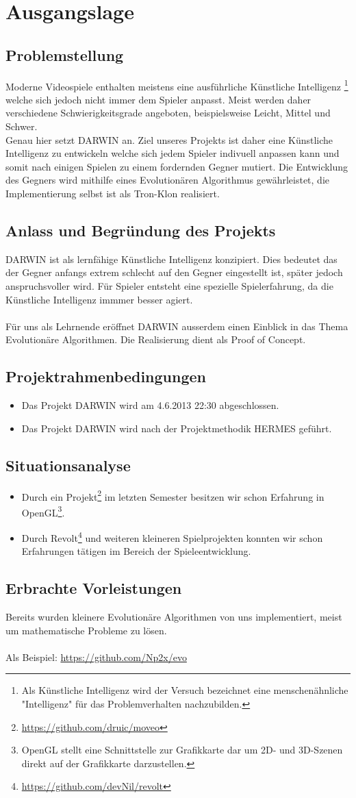 \section{Ausgangslage}
\subsection{Problemstellung}
Moderne Videospiele enthalten meistens eine ausführliche Künstliche Intelligenz
\footnote{Als Künstliche Intelligenz wird der Versuch bezeichnet eine menschenähnliche "Intelligenz" für das Problemverhalten nachzubilden.} welche sich jedoch nicht immer dem Spieler anpasst. Meist werden daher verschiedene Schwierigkeitsgrade angeboten, beispielsweise Leicht, Mittel und Schwer.\\
Genau hier setzt DARWIN an. Ziel unseres Projekts ist daher eine Künstliche Intelligenz zu entwickeln welche sich jedem Spieler indivuell anpassen kann und somit nach einigen Spielen zu einem fordernden Gegner mutiert. Die Entwicklung des Gegners wird mithilfe eines Evolutionären Algorithmus gewährleistet, die Implementierung selbst ist als Tron-Klon realisiert.
\subsection{Anlass und Begründung des Projekts}
DARWIN ist als lernfähige Künstliche Intelligenz konzipiert. Dies bedeutet das der Gegner anfangs extrem schlecht auf den Gegner eingestellt ist, später jedoch anspruchsvoller wird. Für Spieler entsteht eine spezielle Spielerfahrung, da die Künstliche Intelligenz immmer besser agiert. \\\\Für uns als Lehrnende eröffnet DARWIN ausserdem einen Einblick in das Thema Evolutionäre Algorithmen. Die Realisierung dient als Proof of Concept.
\subsection{Projektrahmenbedingungen}
\begin{itemize}
	\item Das Projekt DARWIN wird am 4.6.2013 22:30 abgeschlossen.
	\item Das Projekt DARWIN wird nach der Projektmethodik HERMES geführt.
\end{itemize}
\subsection{Situationsanalyse}
\begin{itemize}
	\item Durch ein Projekt\footnote{\url{https://github.com/druic/moveo}} im letzten Semester besitzen wir schon Erfahrung in
	OpenGL\footnote{OpenGL stellt eine Schnittstelle zur Grafikkarte dar um 2D- und 3D-Szenen direkt auf der Grafikkarte darzustellen.}.
	\item Durch Revolt\footnote{\url{https://github.com/devNil/revolt}} und weiteren kleineren Spielprojekten konnten wir schon Erfahrungen
	tätigen im Bereich der Spieleentwicklung.
\end{itemize}
\subsection{Erbrachte Vorleistungen}
Bereits wurden kleinere Evolutionäre Algorithmen von uns implementiert, meist um mathematische Probleme zu lösen.
\\\\ Als Beispiel: \url{https://github.com/Np2x/evo}